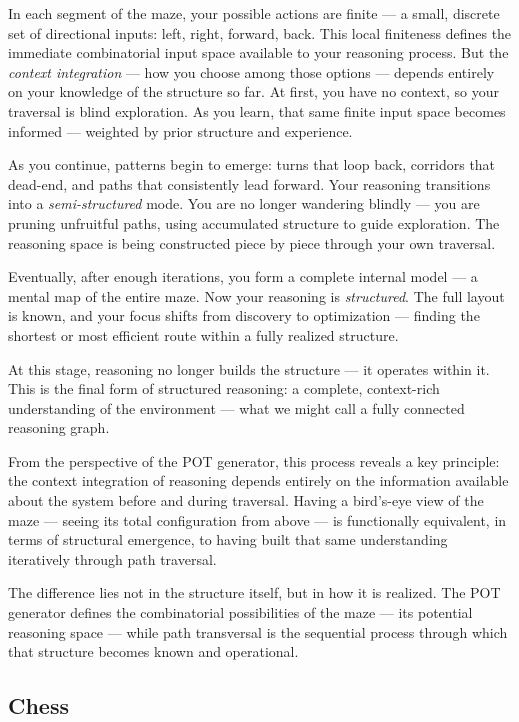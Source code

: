 \documentclass[11pt]{article}
\begin{document}
In each segment of the maze, your possible actions are finite --- a small, discrete set of directional inputs: left, right, forward, back. This local finiteness defines the immediate combinatorial input space available to your reasoning process. But the \textit{context integration} --- how you choose among those options --- depends entirely on your knowledge of the structure so far. At first, you have no context, so your traversal is blind exploration. As you learn, that same finite input space becomes informed --- weighted by prior structure and experience.

As you continue, patterns begin to emerge: turns that loop back, corridors that dead-end, and paths that consistently lead forward. Your reasoning transitions into a \textit{semi-structured} mode. You are no longer wandering blindly --- you are pruning unfruitful paths, using accumulated structure to guide exploration. The reasoning space is being constructed piece by piece through your own traversal.

Eventually, after enough iterations, you form a complete internal model --- a mental map of the entire maze. Now your reasoning is \textit{structured}. The full layout is known, and your focus shifts from discovery to optimization --- finding the shortest or most efficient route within a fully realized structure.

At this stage, reasoning no longer builds the structure --- it operates within it. This is the final form of structured reasoning: a complete, context-rich understanding of the environment --- what we might call a fully connected reasoning graph.

From the perspective of the POT generator, this process reveals a key principle: the context integration of reasoning depends entirely on the information available about the system before and during traversal. Having a bird’s-eye view of the maze --- seeing its total configuration from above --- is functionally equivalent, in terms of structural emergence, to having built that same understanding iteratively through path traversal.

The difference lies not in the structure itself, but in how it is realized. The POT generator defines the combinatorial possibilities of the maze --- its potential reasoning space --- while path transversal is the sequential process through which that structure becomes known and operational.

\subsection{Chess}
\end{document}
